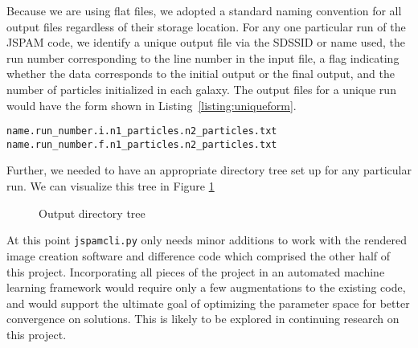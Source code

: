 Because we are using flat files, we adopted a standard naming convention for all
output files regardless of their storage location. For any one particular run of
the JSPAM code, we identify a unique output file via the SDSSID or name used,
the run number corresponding to the line number in the input file, a flag
indicating whether the data corresponds to the initial output or the final
output, and the number of particles initialized in each galaxy. The output files
for a unique run would have the form shown in Listing~\ref{listing:uniqueform}.
%
\begin{samepage}
\begin{lstlisting}[caption={Output files from JSPAM}, label={listing:uniqueform}]
name.run_number.i.n1_particles.n2_particles.txt
name.run_number.f.n1_particles.n2_particles.txt
\end{lstlisting}
\end{samepage}
%
Further, we needed to have an appropriate directory tree set up for any
particular run. We can visualize this tree in Figure \ref{fig:the_tree}
%
\begin{figure}[H]
    \caption[Output directory tree]{Output directory tree}
    \label{fig:the_tree}
\end{figure}
%
At this point \texttt{jspamcli.py} only needs minor additions to work with
the rendered image creation software and difference code which comprised the
other half of this project. Incorporating all pieces of the project in an
automated machine learning framework would require only a few augmentations
to the existing code, and would support the ultimate goal of optimizing
the parameter space for better convergence on solutions.
This is likely to be explored in continuing research on this project.
